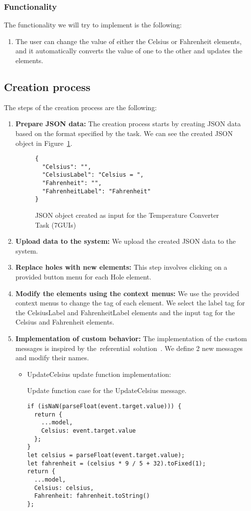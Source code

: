 \subsubsection{Functionality}
The functionality we will try to implement is the following:
\begin{enumerate}
	\item The user can change the value of either the Celsius or Fahrenheit elements, and it automatically converts the value of one to the other and updates the elements.
\end{enumerate}
\medskip
\subsection {Creation process}
The steps of the creation process are the following:
\begin{enumerate}
	\item \textbf{Prepare JSON data:} The creation process starts by creating JSON data based on the format specified by the task.
	      We can see the created JSON object in Figure~\ref{fig:temp-json}.
	      \begin{figure}[H]
		      \caption{JSON object created as input for the Temperature Converter Task (7GUIs)}
		      \centering
		      \label{fig:temp-json}
		      \begin{lstlisting}
{
  "Celsius": "",
  "CelsiusLabel": "Celsius = ",
  "Fahrenheit": "",
  "FahrenheitLabel": "Fahrenheit"
}
    \end{lstlisting}
	      \end{figure}
	\item \textbf{Upload data to the system:} We upload the created JSON data to the system.
	\item \textbf{Replace holes with new elements:} This step involves clicking on a provided button menu for each Hole element.
	\item \textbf{Modify the elements using the context menus:} We use the provided context menus to change the tag of each element.
	      We select the label tag for the CelsiusLabel and FahrenheitLabel elements and the input tag for the Celsius and Fahrenheit elements.
	\item \textbf{Implementation of custom behavior:} The implementation of the custom messages is inspired by the~referential~solution~\cite{7guis-React-TypeScript-MobX/src/app/guis/tempconv.tsx}. We define 2 new messages and modify their names.
	      \begin{itemize}
		      \item UpdateCelsius update function implementation:
		            \begin{listing}[htbp]
			            \caption{Update function case for the UpdateCelsius message.}
			            \begin{lstlisting}
if (isNaN(parseFloat(event.target.value))) {
  return {
    ...model,
    Celsius: event.target.value
  };
}
let celsius = parseFloat(event.target.value);
let fahrenheit = (celsius * 9 / 5 + 32).toFixed(1);
return {
  ...model,
  Celsius: celsius,
  Fahrenheit: fahrenheit.toString()
};            \end{lstlisting}
		            \end{listing}


\end{itemize}
\end{enumerate}
